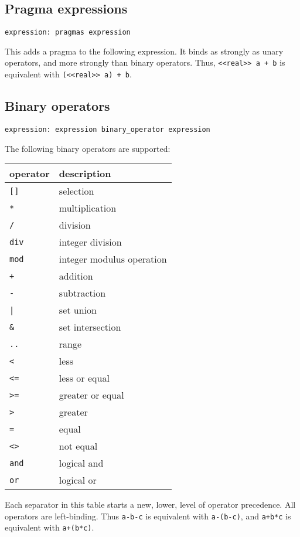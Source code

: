 \documentclass[a4paper]{article}
\begin{document}
\subsection{Pragma expressions}
\begin{verbatim}
expression: pragmas expression
\end{verbatim}
This adds a pragma to the following expression. It binds as strongly
as unary operators, and more strongly than binary operators.
Thus, \verb'<<real>> a + b' is equivalent with \verb'(<<real>> a) + b'.
\subsection{Binary operators}
\begin{verbatim}
expression: expression binary_operator expression
\end{verbatim}
The following binary operators are supported:
\begin{center}
\begin{tabular}{|l|l|}
\hline
operator & description \\
\hline
\verb"[]" & selection \\
\hline
\verb"*" & multiplication \\
\verb"/" & division \\
{\tt div} & integer division \\
{\tt mod} & integer modulus operation \\
\hline
\verb"+" & addition \\
\verb"-" & subtraction \\
\verb"|" & set union \\
\verb"&" & set intersection \\
\hline
\verb".." & range \\
\hline
\verb"<" & less \\
\verb"<=" & less or equal \\
\verb">=" & greater or equal \\
\verb">" & greater \\
\verb"=" & equal \\
\verb"<>" & not equal \\
\hline
{\tt and} & logical and \\
{\tt or} & logical or \\
\hline
\end{tabular}
\end{center}
Each separator in this table starts a new, lower, level of operator precedence.
All operators are left-binding.
Thus \verb"a-b-c" is equivalent with \verb"a-(b-c)", and 
\verb"a+b*c" is equivalent with \verb"a+(b*c)".
\end{document}
